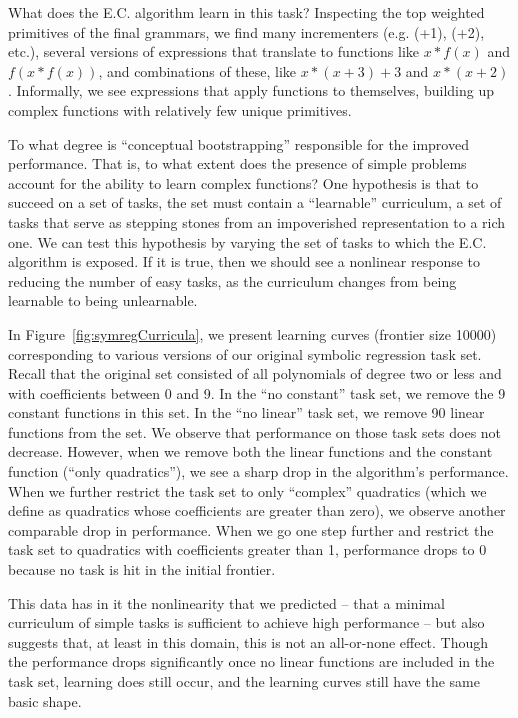 \documentclass{article}
\begin{document}
What does the E.C. algorithm learn in this task?  Inspecting the top
weighted primitives of the final grammars, we find many incrementers
(e.g. (+1), (+2), etc.), several versions of expressions that
translate to functions like $x*f(x)$ and $f(x*f(x))$, and combinations
of these, like $x*(x+3)+3$ and $x*(x+2)$. Informally, we see
expressions that apply functions to themselves, building up complex
functions with relatively few unique primitives. 

To what degree is ``conceptual bootstrapping'' responsible for the
improved performance. That is, to what extent does the presence of
simple problems account for the ability to learn complex functions?
One hypothesis is that to succeed on a set of tasks, the set must
contain a ``learnable'' curriculum, a set of tasks that serve as
stepping stones from an impoverished representation to a rich one. We
can test this hypothesis by varying the set of tasks to which the E.C.
algorithm is exposed. If it is true, then we should see a nonlinear
response to reducing the number of easy tasks, as the curriculum
changes from being learnable to being unlearnable.

In Figure~\ref{fig:symregCurricula}, we present learning curves
(frontier size 10000) corresponding to various versions of our
original symbolic regression task set. Recall that the original set
consisted of all polynomials of degree two or less and with
coefficients between 0 and 9. In the ``no constant'' task set, we
remove the 9 constant functions in this set. In the ``no linear'' task
set, we remove 90 linear functions from the set. We observe that
performance on those task sets does not decrease. However, when we
remove both the linear functions and the constant function (``only
quadratics''), we see a sharp drop in the algorithm's
performance. When we further restrict the task set to only ``complex''
quadratics (which we define as quadratics whose
coefficients are greater than zero), we observe another comparable
drop in performance. When we go one step further and restrict the task
set to quadratics with coefficients greater than 1, performance drops
to 0 because no task is hit in the initial frontier. 

This data has in it the nonlinearity that we predicted -- that a
minimal curriculum of simple tasks is sufficient to achieve high
performance -- but also suggests that, at least in this domain, this
is not an all-or-none effect. Though the performance drops
significantly once no linear functions are included in the task set,
learning does still occur, and the learning curves still have the same
basic shape. 
\end{document}
